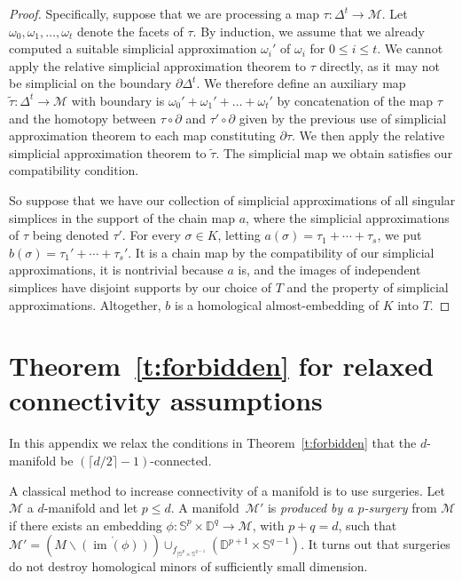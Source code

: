 \documentclass[a4paper,UKenglish,thm-restate]{article}
\newcommand{\M}{\mathcal{M}}
\DeclareMathOperator{\im}{im}
\newcommand{\defn}[1]{\emph{\color{violet}#1}}
\newcommand{\pth}[1]{\left(#1\right)}
\begin{document}
\begin{proof}
\medskip

Specifically, suppose that we are processing a map $\tau:\Delta^t\to \M$. Let $\omega_0,\omega_1, \ldots, \omega_t$ denote the facets of $\tau$. By induction, we assume that we already computed a suitable simplicial approximation $\omega_i'$ of $\omega_i$ for $0 \le i \le t$. We cannot apply the relative simplicial approximation theorem to $\tau$ directly, as it may not be simplicial on the boundary $\partial \Delta^t$. We therefore define an auxiliary map $\widetilde \tau:\Delta^t\to\M$ with boundary is $\omega_0'+ \omega_1' + \ldots+\omega_t'$ by concatenation of the map $\tau$ and the homotopy between $\tau\circ\partial$ and $\tau'\circ\partial$ given by the previous use of simplicial approximation theorem to each map constituting $\partial\tau$. We then apply the relative simplicial approximation theorem to  $\widetilde \tau$. The simplicial map we obtain satisfies our compatibility condition.

\medskip

So suppose that we have our collection of simplicial approximations of all singular simplices in the support of the chain map $a$, where the simplicial approximations of $\tau$ being denoted $\tau'$. For every $\sigma\in K$, letting $a(\sigma)=\tau_1+\cdots+\tau_s$, we put $b(\sigma)=\tau_1'+\cdots+\tau_s'$. It is a chain map by the compatibility of our simplicial approximations, it is nontrivial because $a$ is, and the images of independent simplices have disjoint supports by our choice of $T$ and the property of simplicial approximations. Altogether, $b$ is a homological almost-embedding of $K$ into $T$.
\end{proof}


\section{Theorem~\ref{t:forbidden} for relaxed connectivity assumptions}\label{app:relax}

In this appendix we relax the conditions in Theorem~\ref{t:forbidden} that the $d$-manifold be $(\lceil d/2 \rceil -1)$-connected. 

\medskip

A classical method to increase connectivity of a manifold is to use surgeries. Let $\M$ a $d$-manifold and let $p \le d$. A manifold~$\M'$ is \defn{produced by a $p$-surgery} from $\M$ if there exists an embedding $\phi:\mathbb{S}^p\times \mathbb{D}^{q}\to \M$, with $p+q=d$, such that $\M'= \pth{M\backslash \mathring{\pth{\im(\phi)}}}\cup_{f_{|\mathbb{S}^p\times\mathbb{S}^{q-1}}}\pth{\mathbb{D}^{p+1}\times\mathbb{S}^{q-1}}$. It turns out that surgeries do not destroy homological minors of sufficiently small dimension.
\end{document}
